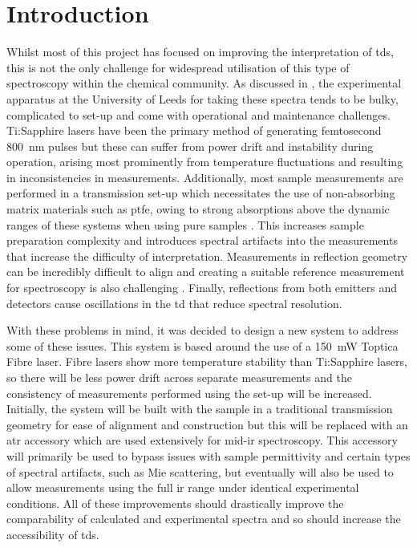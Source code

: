 \section{Introduction}
Whilst most of this project has focused on improving the interpretation of \acrshort{tds}, this is not the only challenge for widespread utilisation of this type of spectroscopy within the chemical community. As discussed in , the experimental apparatus at the University of Leeds for taking these spectra tends to be bulky, complicated to set\nobreakdash-up and come with operational and maintenance challenges. Ti:Sapphire lasers have been the primary method of generating femtosecond \SI{800}{nm} pulses \cite{Druon2007} but these can suffer from power drift and instability during operation, arising most prominently from temperature fluctuations and resulting in inconsistencies in measurements. Additionally, most sample measurements are performed in a transmission set\nobreakdash-up which necessitates the use of non\nobreakdash-absorbing matrix materials such as \acrshort{ptfe}, owing to strong absorptions above the dynamic ranges of these systems when using pure samples \cite{Zeitler2016, Smith2011, Murphy2022}. This increases sample preparation complexity and introduces spectral artifacts into the measurements that increase the difficulty of interpretation. Measurements in reflection geometry can be incredibly difficult to align and creating a suitable reference measurement for spectroscopy is also challenging \cite{Smith2011}. Finally, reflections from both emitters and detectors cause oscillations in the \acrshort{td} that reduce spectral resolution.

With these problems in mind, it was decided to design a new system to address some of these issues. This system is based around the use of a \SI{150}{mW} Toptica Fibre laser. Fibre lasers show more temperature stability than Ti:Sapphire lasers, so there will be less power drift across separate measurements and the consistency of measurements performed using the set\nobreakdash-up will be increased. Initially, the system will be built with the sample in a traditional transmission geometry for ease of alignment and construction but this will be replaced with an \acrfull{atr} accessory which are used extensively for mid\nobreakdash-\acrshort{ir} spectroscopy. This accessory will primarily be used to bypass issues with sample permittivity and certain types of spectral artifacts, such as Mie scattering, but eventually will also be used to allow measurements using the full \acrshort{ir} range under identical experimental conditions. All of these improvements should drastically improve the comparability of calculated and experimental spectra and so should increase the accessibility of \acrshort{tds}. 

